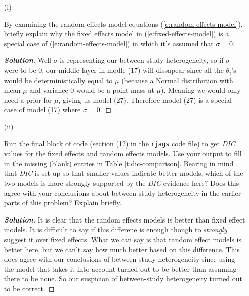 \documentclass[12pt]{article}
\newenvironment{solution}{\begin{tcolorbox}[breakable]\begin{proof}[\textbf{\textit{Solution}}] }{\end{proof}\end{tcolorbox}}
\begin{document}
\begin{itemize}
\begin{itemize}
\item[(i)]

By examining the random effects model equations (\ref{e:random-effects-model}), briefly explain why the fixed effects model in (\ref{e:fixed-effects-model}) is a special case of (\ref{e:random-effects-model}) in which it's assumed that $\sigma = 0$. \textit{\fbox{\textbf{[5 points]}}}

\begin{solution}
    Well $\sigma$ is representing our between-study heterogeneity, so if $\sigma$ were to be 0, our middle layer in modle (17) will dissapear since all the $\theta_i$'s would be deterministically equal to $\mu$ (because a Normal distribution with mean $\mu$ and variance 0 would be a point mass at $\mu$). Meaning we would only need a prior for $\mu$, giving us model (27). Therefore model (27) is a special case of model (17) where $\sigma = 0$. 
\end{solution}

\item[(ii)]

Run the final block of code (section (12) in the \texttt{rjags} code file) to get 
\textit{DIC} values for the fixed effects and random effects models. Use your output to fill in the missing (blank) entries in Table \ref{t:dic-comparison}. Bearing in mind that \textit{DIC} is set up so that smaller values indicate better models, which of the two models is more strongly supported by the \textit{DIC} evidence here? Does this agree with your conclusions about between-study heterogeneity in the earlier parts of this problem? Explain briefly. \textit{\fbox{\textbf{[15 points]}}}

\begin{solution}
    It is clear that the random effects models is better than fixed effect models. It is difficult to say if this differene is enough though to \textit{strongly} suggest it over fixed effects. What we can say is that random effect models is better here, but we can't say how much better based on this difference. This does agree with our conclusions of between-study heterogeneity since using the model that takes it into account turned out to be better than assuming there to be none. So our suspicion of between-study heterogeneity turned out to be correct. 
\end{solution}

\end{itemize}

\begin{table}[t!]


\end{table}
\end{itemize}
\end{document}
